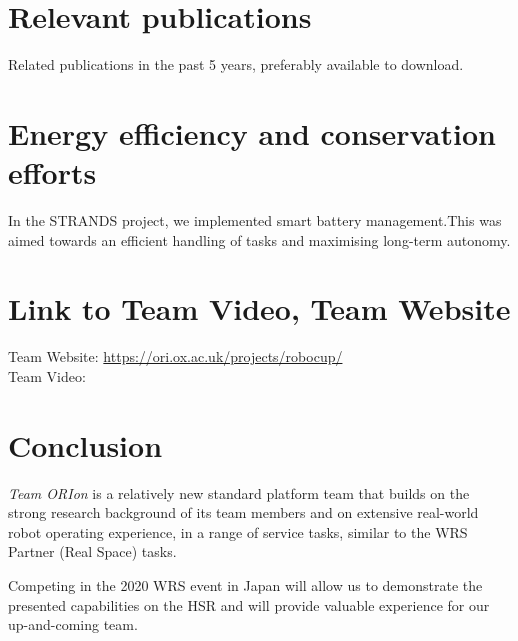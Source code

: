 \documentclass[runningheads,a4paper]{llncs}
\newcommand{\teamori}{Team ORIon}
\begin{document}
\section{Relevant publications }
Related publications in the past 5 years, preferably available to download.

\section{Energy efficiency and conservation efforts}
In the STRANDS project, we implemented smart battery management.This was aimed towards an efficient handling of tasks and maximising long-term autonomy.

\section{Link to Team Video, Team Website}
Team Website: \url{https://ori.ox.ac.uk/projects/robocup/} \\
Team Video: \url{} \\



\section{Conclusion}
\textit{\teamori{}} is a relatively new standard platform team that builds on the strong research 
background of its team members and on extensive real-world robot operating
experience, in a range of service tasks, similar to the WRS Partner (Real Space) tasks. 

Competing in the 2020 WRS event in Japan will allow us to demonstrate 
the presented capabilities on the HSR and will provide valuable experience
for our up-and-coming team.



\end{document}
